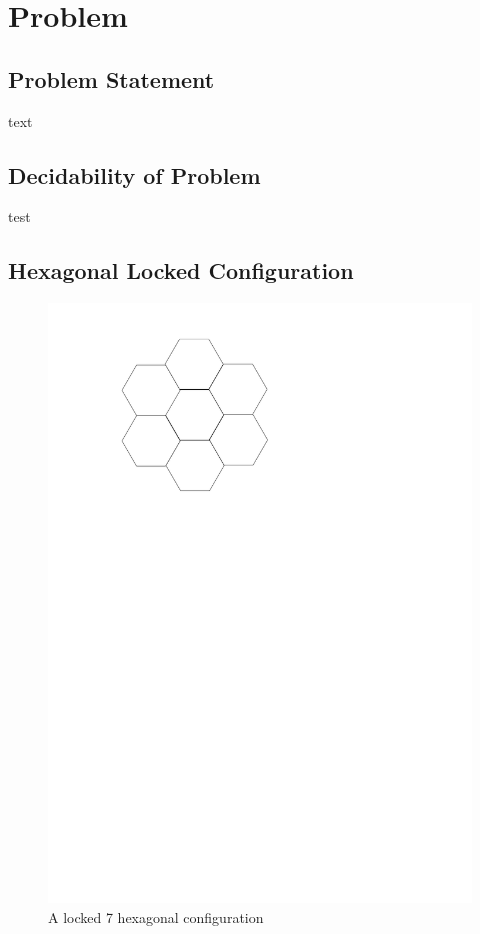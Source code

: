 \section{Problem}
\subsection{Problem Statement} text
\subsection{Decidability of Problem} test
\subsection{Hexagonal Locked Configuration}
\begin{figure}[ht]
\begin{center}
\includegraphics{graphics/7hexLocked.pdf}
\caption{A locked 7 hexagonal configuration}
\label{figure:7hexLocked}
\end{center} 
\end{figure}
\newpage